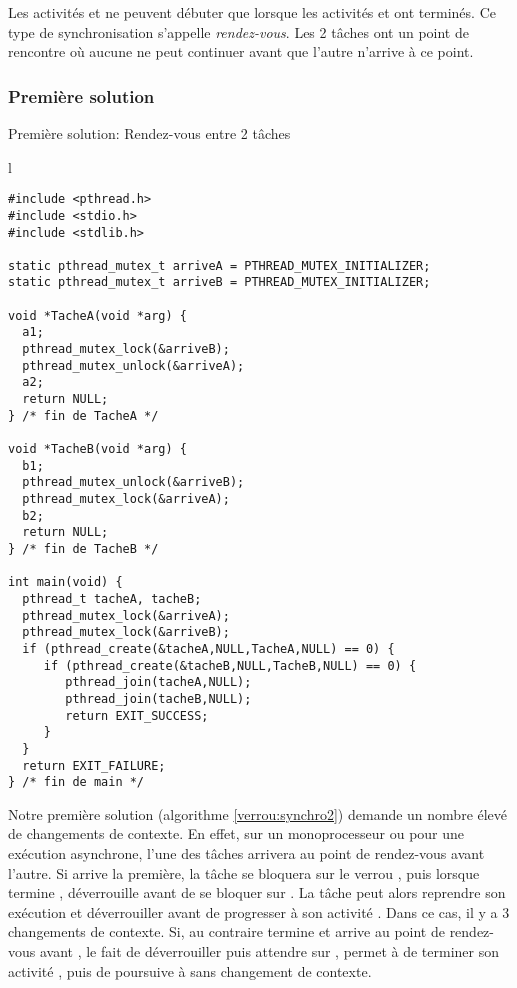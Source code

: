 Les activités  et  ne peuvent débuter que lorsque les activités  et  ont terminés. Ce type de synchronisation s'appelle {\em rendez-vous}. Les 2 tâches ont un point de rencontre où aucune ne peut continuer avant que l'autre n'arrive à ce point.

\subsubsection*{Première solution}
\begin{algorithm}[t]
\caption{Première solution: Rendez-vous entre 2 tâches}\label{verrou:synchro2}
\begin{center}
\begin{tabular}{l}
\begin{lstlisting}
#include <pthread.h>
#include <stdio.h>
#include <stdlib.h>

static pthread_mutex_t arriveA = PTHREAD_MUTEX_INITIALIZER;
static pthread_mutex_t arriveB = PTHREAD_MUTEX_INITIALIZER;

void *TacheA(void *arg) {
  a1;
  pthread_mutex_lock(&arriveB);
  pthread_mutex_unlock(&arriveA);
  a2;
  return NULL;
} /* fin de TacheA */

void *TacheB(void *arg) {
  b1;
  pthread_mutex_unlock(&arriveB);
  pthread_mutex_lock(&arriveA);
  b2;
  return NULL;
} /* fin de TacheB */

int main(void) {
  pthread_t tacheA, tacheB;
  pthread_mutex_lock(&arriveA);
  pthread_mutex_lock(&arriveB);
  if (pthread_create(&tacheA,NULL,TacheA,NULL) == 0) {
     if (pthread_create(&tacheB,NULL,TacheB,NULL) == 0) {
        pthread_join(tacheA,NULL);
        pthread_join(tacheB,NULL);
        return EXIT_SUCCESS;
     }
  }
  return EXIT_FAILURE;
} /* fin de main */
\end{lstlisting}
\end{tabular}
\end{center}
\end{algorithm}

Notre première solution (algorithme \ref{verrou:synchro2}) demande un nombre élevé de changements de contexte. En effet, sur un monoprocesseur ou pour une exécution asynchrone, l'une des tâches arrivera au point de rendez-vous avant l'autre. Si  arrive la première, la tâche se bloquera sur le verrou , puis lorsque  termine ,  déverrouille  avant de se bloquer sur . La tâche  peut alors reprendre son exécution et déverrouiller  avant de progresser à son activité . Dans ce cas, il y a 3 changements de contexte. Si, au contraire  termine  et arrive au point de rendez-vous avant , le fait de déverrouiller  puis attendre sur , permet à  de terminer son activité , puis de poursuive à  sans changement de contexte.

